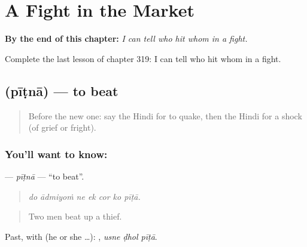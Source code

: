 
\chapter{A Fight in the Market}
\label{ch:hi-a-fight-in-the-market}

\begin{chapteropening}
\textbf{By the end of this chapter:} \emph{I can tell who hit whom in a fight.}

Complete the last lesson of chapter 319: I can tell who hit whom in a fight.
\end{chapteropening}

\section[\texorpdfstring{\hi{पीटना} (pīṭnā)}{पीटना (pīṭnā)}]{ (pīṭnā) — to beat}

\label{lesson:HI-C319-pitna}



\begin{quote}
Before the new one: say the Hindi for to quake, then the Hindi for a shock (of grief or fright).
\end{quote}

\subsection*{You'll want to know: }
\textbf{} — \emph{pīṭnā} — \textquotedblleft{}to beat\textquotedblright{}.

\begin{quote}
      
\end{quote}

\begin{quote}
\emph{do ādmiyoṁ ne ek cor ko pīṭā.}
\end{quote}

\begin{quote}
Two men beat up a thief.
\end{quote}

Past, with  (he or she …):   , \emph{usne ḍhol pīṭā}.

